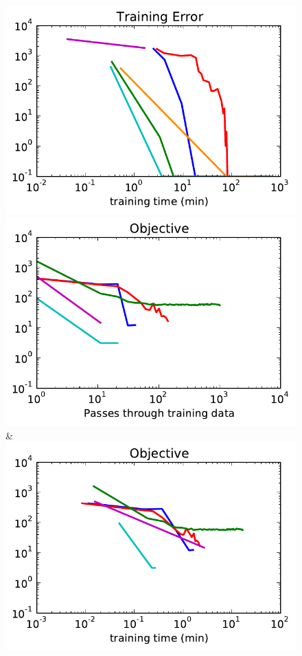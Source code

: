 \begin{figure}
\begin{tabu}
    \includegraphics[width=\linewidth]{evaluation/images/snakes_ad3_time_loss}\\
    \includegraphics[width=\linewidth]{evaluation/images/snakes_qpbo}&%
    \includegraphics[width=\linewidth]{evaluation/images/snakes_qpbo_time}\\

\end{tabu}
\end{figure}
